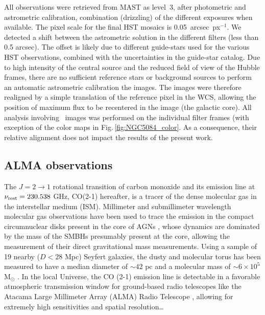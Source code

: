 \documentclass[modern]{aastex631}
\begin{document}
All observations were retrieved from MAST as level~3, after photometric and astrometric calibration, combination (drizzling) of the different exposures when available. The pixel scale for the final HST mosaics is 0.05~arcsec~px$^{-1}$. We detected a shift between the astrometric solution in the different filters (less than 0.5 arcsec). The offset is likely due to different guide-stars used for the various HST observations, combined with the uncertainties in the guide-star catalog. Due to high intensity of the central source and the reduced field of view of the Hubble frames, there are no sufficient reference stars or background sources to perform an automatic astrometric calibration the images. The images were therefore realigned by a simple translation of the reference pixel in the WCS, allowing the position of maximum flux to be recentered in the image (the galactic core). All analysis involving \Hubble\ images was performed on the individual filter frames (with exception of the color maps in Fig.\,\ref{fig:NGC5084_color}. As a consequence, their relative alignment does not impact the results of the present work.

\subsection{ALMA observations} 
\label{subsec:data_ALMA}

The $J = 2 \rightarrow 1$ rotational transition of carbon monoxide and its emission line at $\nu_{\rm rest} = 230.538$ GHz, CO(2-1) hereafter, is a tracer of the dense molecular gas in the interstellar medium (ISM). Millimeter and submillimeter wavelength molecular gas observations have been used to trace the emission in the compact circumnuclear disks present in the core of AGNs \citep{garciaburillo+2021aap652_98}, whose dynamics are dominated by the mass of the SMBHs presumably present at the core, allowing the measurement of their direct gravitational mass \citep{davis+2013nat494_328,onishi+2015apj806_39} measurements. Using a sample of 19 nearby ($D<28$ Mpc) Seyfert galaxies, the dusty and molecular torus has been measured to have a median diameter of $\sim42$ pc and a molecular mass of $\sim6\times10^{5}$ M$_{\odot}$ \citep{garciaburillo+2021aap652_98}. In the local Universe, the CO (2-1) emission line is detectable in a favorable atmospheric transmission window for ground-based radio telescopes like the Atacama Large Millimeter Array (ALMA) Radio Telescope \citep{leroy+2021apj257_43}, allowing for extremely high sensitivities and spatial resolution…
\end{document}
